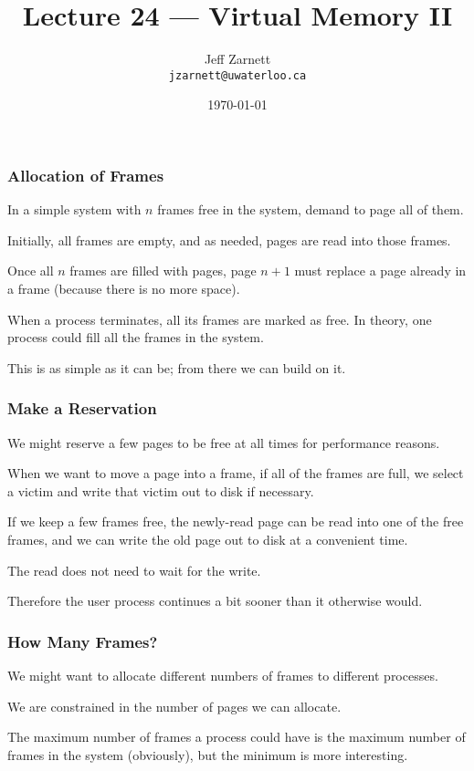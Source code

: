 

\title{Lecture 24 --- Virtual Memory II }

\author{Jeff Zarnett \\ \small \texttt{jzarnett@uwaterloo.ca}}
\date{\today}




\begin{frame}
  \titlepage

 \end{frame}


\begin{frame}
\frametitle{Allocation of Frames}

In a simple system with $n$ frames free in the system, demand to page all of them. 

Initially, all frames are empty, and as needed, pages are read into those frames. 

Once all $n$ frames are filled with pages, page $n+1$ must replace a page already in a frame (because there is no more space). 

When a process terminates, all its frames are marked as free. In theory, one process could fill all the frames in the system. 

This is as simple as it can be; from there we can build on it.


\end{frame}

\begin{frame}
\frametitle{Make a Reservation}

We might reserve a few pages to be free at all times for performance reasons. 

When we want to move a page into a frame, if all of the frames are full, we select a victim and write that victim out to disk if necessary. 

If we keep a few frames free, the newly-read page can be read into one of the free frames, and we can write the old page out to disk at a convenient time. 

The read does not need to wait for the write.

Therefore the user process continues a bit sooner than it otherwise would.

\end{frame}

\begin{frame}
\frametitle{How Many Frames?}

We might want to allocate different numbers of frames to different processes.

We are constrained in the number of pages we can allocate. 

The maximum number of frames a process could have is the maximum number of frames in the system (obviously), but the minimum is more interesting.


\end{frame}


